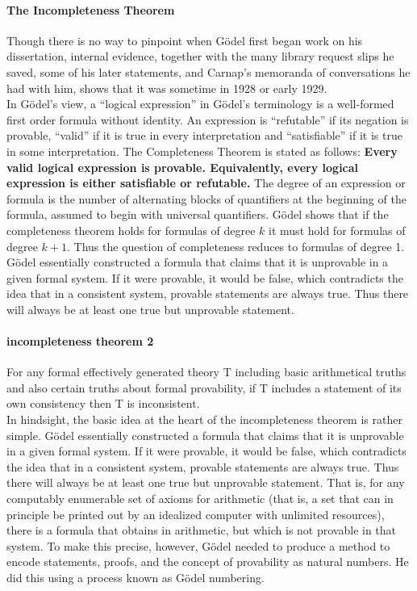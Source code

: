 \documentclass[12pt]{article}
\newcommand{\gd}{G{\"o}del }
\newcommand{\gds}{G{\"o}del's }
\begin{document}
 \paragraph{The Incompleteness Theorem}
 Though there is no way to pinpoint when \gd first began work on his dissertation, internal evidence, together with the many library request slips he saved, some of his later statements, and Carnap's memoranda of conversations he had with him, shows that it was sometime in 1928 or early 1929.\\
 In \gds view, a ``logical expression'' in \gds terminology is a well-formed first order formula without identity. An expression is ``refutable'' if its negation is provable, ``valid'' if it is true in every interpretation and ``satisfiable'' if it is true in some interpretation. The Completeness Theorem is stated as follows:
 \textbf{Every valid logical expression is provable. Equivalently, every logical expression is either satisfiable or refutable.}
 The degree of an expression or formula is the number of alternating blocks of quantifiers at the beginning of the formula, assumed to begin with universal quantifiers. \gd shows that if the completeness theorem holds for formulas of degree $k$ it must hold for formulas of degree $k + 1$. Thus the question of completeness reduces to formulas of degree 1.
 \gd  essentially constructed a formula that claims that it is unprovable in a given formal system. If it were provable, it would be false, which contradicts the idea that in a consistent system, provable statements are always true. Thus there will always be at least one true but unprovable statement. 
 \paragraph {incompleteness theorem 2}
 For any formal effectively generated theory T including basic arithmetical truths and also certain truths about formal provability, if T includes a statement of its own consistency then T is inconsistent.\\
 In hindsight, the basic idea at the heart of the incompleteness theorem is rather simple. \gd essentially constructed a formula that claims that it is unprovable in a given formal system. If it were provable, it would be false, which contradicts the idea that in a consistent system, provable statements are always true. Thus there will always be at least one true but unprovable statement. That is, for any computably enumerable set of axioms for arithmetic (that is, a set that can in principle be printed out by an idealized computer with unlimited resources), there is a formula that obtains in arithmetic, but which is not provable in that system. To make this precise, however, \gd needed to produce a method to encode statements, proofs, and the concept of provability as natural numbers. He did this using a process known as \gd numbering.
\end{document}

